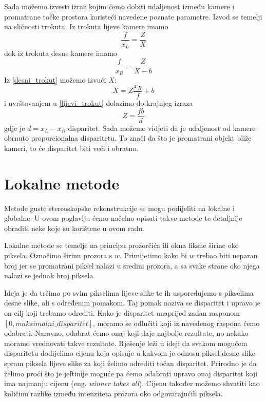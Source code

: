 \documentclass[utf8, zavrsni, numeric]{fer}
\begin{document}
Sada možemo izvesti izraz kojim ćemo dobiti udaljenost između kamere i promatrane točke prostora
koristeći navedene poznate parametre. Izvod se temelji na sličnosti trokuta. Iz trokuta lijeve kamere imamo
\begin{equation}
\frac{f}{x_L} = \frac{Z}{X} \label{lijevi_trokut}
\end{equation}
dok iz trokuta desne kamere imamo
\begin{equation}
\frac{f}{x_R} = \frac{Z}{X - b} \label{desni_trokut}
\end{equation}
Iz \ref{desni_trokut} možemo izvući $X$:
\begin{equation}
X = Z\frac{x_R}{f} + b \label{desni_x}
\end{equation}
i uvrštavanjem u \ref{lijevi_trokut} dolazimo do krajnjeg izraza
\begin{equation}
Z = \frac{fb}{d} \label{udaljenost}
\end{equation}
gdje je $d = x_L - x_R$ disparitet.
Sada možemo vidjeti da je udaljenost od kamere obrnuto proporcionalna disparitetu. To znači da što
je promatrani objekt bliže kameri, to će disparitet biti veći i obratno.

\chapter{Lokalne metode}
Metode guste stereoskopske rekonstrukcije se mogu podijeliti na lokalne i globalne. U ovom poglavlju ćemo načelno opisati takve metode te detaljnije obraditi neke koje su korištene u ovom radu.

Lokalne metode se temelje na principu prozorčića ili okna fiksne širine oko piksela. Označimo širinu prozora s $w$. Primijetimo kako bi $w$ trebao biti neparan broj jer se promatrani piksel
nalazi u sredini prozora, a sa svake strane oko njega nalazi se jednak broj piksela.

Ideja je da trčimo po svim pikselima lijeve slike te ih uspoređujemo s pikselima desne slike, ali
s određenim pomakom. Taj pomak naziva se disparitet i upravo je on cilj koji trebamo odrediti.
Kako je disparitet unaprijed zadan rasponom $[0, maksimalni\_disparitet]$, moramo se odlučiti
koji iz navedenog raspona ćemo odabrati. Naravno, odabrat ćemo onaj koji daje najbolje rezultate, no nekako moramo vrednovati takve rezultate. Rješenje leži u ideji da svakom mogućem
disparitetu dodijelimo cijenu koja opisuje u kakvom je odnosu piksel desne slike spram piksela
lijeve slike za koji želimo odrediti točan disparitet. Prirodno je da želimo proći što je
jeftinije moguće pa ćemo odabrati upravo onaj disparitet koji ima najmanju cijenu (eng. {\sl winner takes all}). Cijenu
također možemo shvatiti kao količinu razlike između intenziteta prozora oko odgovarajućih piksela.
\end{document}
